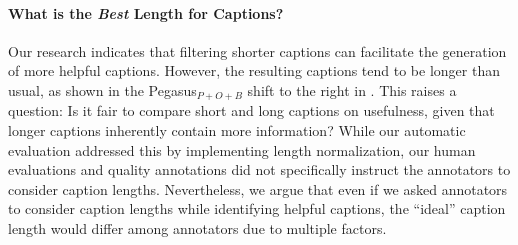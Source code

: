 
\paragraph{What is the \textit{Best} Length for Captions?}
Our research indicates that filtering shorter captions can facilitate the generation of more helpful captions.
However, the resulting captions tend to be longer than usual, as shown in the Pegasus$_{P+O+B}$ shift to the right in . 
This raises a question: Is it fair to compare short and long captions on usefulness, given that longer captions inherently contain more information?
While our automatic evaluation addressed this by implementing length normalization, our human evaluations and quality annotations did not specifically instruct the annotators to consider caption lengths.
Nevertheless, we argue that even if we asked annotators to consider caption lengths while identifying helpful captions, 
the ``ideal'' caption length would differ among annotators due to multiple factors.
